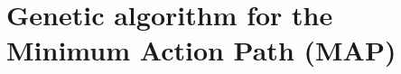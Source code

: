 \documentclass[journal, a4paper]{IEEEtran}
\begin{document}




\section{Genetic algorithm for the Minimum Action Path (MAP)}
%
%
%
%
%
%
%
%
%
\end{document}
